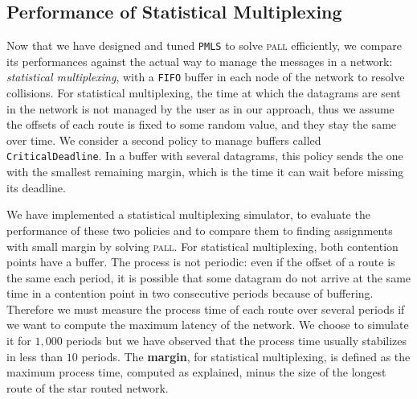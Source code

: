 \documentclass[a4paper,10pt]{journal}
\newcommand\PMLS{\texttt{PMLS}\xspace}
\newcommand\FIFO{\texttt{FIFO}\xspace}
\newcommand\critdead{\texttt{CriticalDeadline}\xspace}
\newcommand\pall{\textsc{pall}\xspace}
\begin{document}
    \subsection{Performance of Statistical Multiplexing}


      Now that we have designed and tuned \PMLS to solve \pall efficiently, we compare its performances against the actual way to manage the messages in a network:  \emph{statistical multiplexing}, with a \FIFO buffer in each node of the network to resolve collisions. For statistical multiplexing, the time at which the datagrams are sent in the network is not managed by the user as in our approach, thus we assume the offsets of each route is fixed to some random value, and they stay the same over time.
      We consider a second policy to manage buffers called \critdead. In a buffer with several datagrams, this policy sends the one with the smallest remaining margin, which is the time it can wait before missing its deadline.


    We have implemented a statistical multiplexing simulator, to evaluate the performance of these two policies and to compare them to finding assignments with small margin by solving \pall. 
    For statistical multiplexing, both contention points have a buffer. The process is not periodic:
    even if the offset of a route is the same each period, it is possible that some datagram do not arrive at the same time in a contention point in two consecutive periods because of buffering. Therefore we must measure the process time of each route over several periods if we want to compute the maximum latency of the network. We choose to simulate it for $1,000$ periods but we have observed that the process time usually stabilizes in less than $10$ periods. The \textbf{margin}, for statistical multiplexing, is defined as the maximum process time, computed as explained, minus the size of the longest route of the star routed network. 


\end{document}
